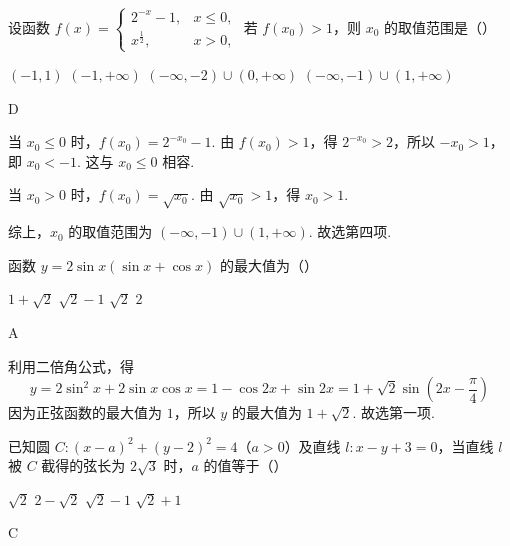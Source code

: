 \begin{problem}
设函数 \( f(x) = \begin{cases}
2^{-x} - 1, & x \leqslant 0,\\
x^{\frac{1}{2}}, & x > 0,
\end{cases} \) 若 \( f(x_0) > 1 \)，则 \( x_0 \) 的取值范围是（\quad）

\choices
    {\((-1, 1)\)}
    {\((-1, +\infty)\)}
    {\((-\infty, -2) \cup (0, +\infty)\)}
    {\((-\infty, -1) \cup (1, +\infty)\)}
\end{problem}

\begin{answer}
D
\end{answer}

\begin{solution}
当 \(x_0\leqslant0\) 时，\(f(x_0)=2^{-x_0}-1\). 由 \(f(x_0)>1\)，得 \(2^{-x_0}>2\)，所以 \(-x_0>1\)，即 \(x_0<-1\). 这与 \(x_0\leqslant0\) 相容.

当 \(x_0>0\) 时，\(f(x_0)=\sqrt{x_0}\). 由 \(\sqrt{x_0}>1\)，得 \(x_0>1\).

综上，\(x_0\) 的取值范围为 \((-\infty,-1)\cup(1,+\infty)\). 故选第四项.
\end{solution}

\begin{problem}
函数 \(y = 2\sin x (\sin x + \cos x)\) 的最大值为（\quad）

\choices
    {\(1 + \sqrt{2}\)}
    {\(\sqrt{2} - 1\)}
    {\(\sqrt{2}\)}
    {\(2\)}
\end{problem}

\begin{answer}
A
\end{answer}

\begin{solution}
利用二倍角公式，得
\[
y=2\sin ^2x+2\sin x\cos x=1-\cos2x+\sin2x
  =1+\sqrt2\sin\left(2x-\frac\pi4\right)
\]
因为正弦函数的最大值为 \(1\)，所以 \(y\) 的最大值为 \(1+\sqrt2\). 故选第一项.
\end{solution}

\begin{problem}
已知圆 \(C: (x - a)^2 + (y - 2)^2 = 4\)（\(a > 0\)）及直线 \(l: x - y + 3 = 0\)，当直线 \(l\) 被 \(C\) 截得的弦长为 \(2\sqrt{3}\) 时，\(a\) 的值等于（\quad）

\choices
    {\(\sqrt{2}\)}
    {\(2 - \sqrt{2}\)}
    {\(\sqrt{2} - 1\)}
    {\(\sqrt{2} + 1\)}
\end{problem}

\begin{answer}
C
\end{answer}

